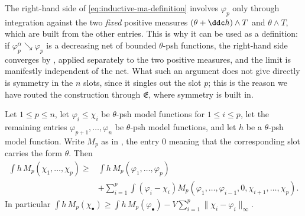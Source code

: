 \begin{remark}
\label{rem:ch24-forced-ibp-as-definition}
The right-hand side of \eqref{eq:inductive-ma-definition} involves
\(\varphi_p\) only through integration against the two \emph{fixed} positive
measures \((\theta+\ddc h)\wedge T\) and \(\theta\wedge T\), which are built
from the other entries.  This is why it can be used as a definition: if
\(\varphi_p^\alpha\searrow\varphi_p\) is a decreasing net of bounded
\(\theta\)-psh functions, the right-hand side converges by
, applied separately to the two positive
measures, and the limit is manifestly independent of the net.  What such an
argument does not give directly is symmetry in the \(n\) slots, since it
singles out the slot \(p\); this is the reason we have routed the
construction through \(\mathfrak E\), where symmetry is built in.
\end{remark}

\begin{proposition}
\label{prop:ch24-approximate-monotonicity}
Let \(1\leq p\leq n\), let \(\varphi_i\leq\chi_i\) be \(\theta\)-psh model
functions for \(1\leq i\leq p\), let the remaining entries
\(\varphi_{p+1},\ldots,\varphi_n\) be \(\theta\)-psh model functions, and let
\(h\) be a \(\theta\)-psh model function.  Write \(M_p\) as in
, the entry \(0\) meaning that the corresponding
slot carries the form \(\theta\).  Then
\begin{equation}
\label{eq:approximate-monotonicity}
\begin{split}
 \int h\,M_p(\chi_1,\ldots,\chi_p)
 \geq{}&\int h\,M_p(\varphi_1,\ldots,\varphi_p)\\
 &+\sum_{i=1}^p\int(\varphi_i-\chi_i)
       M_p(\varphi_1,\ldots,\varphi_{i-1},0,
           \chi_{i+1},\ldots,\chi_p).
\end{split}
\end{equation}
In particular
\(\int h\,M_p(\chi_\bullet)\geq\int h\,M_p(\varphi_\bullet)
 -V\sum_{i=1}^p\|\chi_i-\varphi_i\|_\infty\).
\end{proposition}

